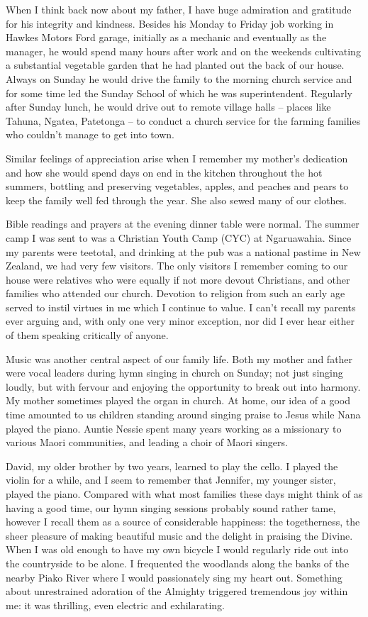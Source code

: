 When I think back now about my father, I have huge admiration and
gratitude for his integrity and kindness. Besides his Monday to Friday
job working in Hawkes Motors Ford garage, initially as a mechanic and
eventually as the manager, he would spend many hours after work and on
the weekends cultivating a substantial vegetable garden that he had
planted out the back of our house. Always on Sunday he would drive the
family to the morning church service and for some time led the
Sunday School of which he was superintendent. Regularly after Sunday
lunch, he would drive out to remote village halls -- places like Tahuna,
Ngatea, Patetonga -- to conduct a church service for the farming
families who couldn't manage to get into town.

Similar feelings of appreciation arise when I remember my mother's
dedication and how she would spend days on end in the kitchen throughout
the hot summers, bottling and preserving vegetables, apples, and peaches
and pears to keep the family well fed through the year. She also sewed
many of our clothes.

Bible readings and prayers at the evening dinner table were normal. The
summer camp I was sent to was a Christian Youth Camp (CYC) at
Ngaruawahia. Since my parents were teetotal, and drinking at the pub was
a national pastime in New Zealand, we had very few visitors. The only
visitors I remember coming to our house were relatives who were equally
if not more devout Christians, and other families who attended our
church. Devotion to religion from such an early age served to instil
virtues in me which I continue to value. I can't recall my parents ever
arguing and, with only one very minor exception, nor did I ever hear
either of them speaking critically of anyone.

Music was another central aspect of our family life. Both my mother and
father were vocal leaders during hymn singing in church on Sunday; not
just singing loudly, but with fervour and enjoying the opportunity to
break out into harmony. My mother sometimes played the organ in church.
At home, our idea of a good time amounted to us children standing around
singing praise to Jesus while Nana played the piano. Auntie Nessie spent
many years working as a missionary to various Maori communities, and
leading a choir of Maori singers.

David, my older brother by two years, learned to play the cello. I
played the violin for a while, and I seem to remember that Jennifer, my
younger sister, played the piano. Compared with what most families these
days might think of as having a good time, our hymn singing sessions
probably sound rather tame, however I recall them as a source of
considerable happiness: the togetherness, the sheer pleasure of making
beautiful music and the delight in praising the Divine. When I was old
enough to have my own bicycle I would regularly ride out into the
countryside to be alone. I frequented the woodlands along the banks of
the nearby Piako River where I would passionately sing my heart out.
Something about unrestrained adoration of the Almighty triggered
tremendous joy within me: it was thrilling, even electric and
exhilarating.

